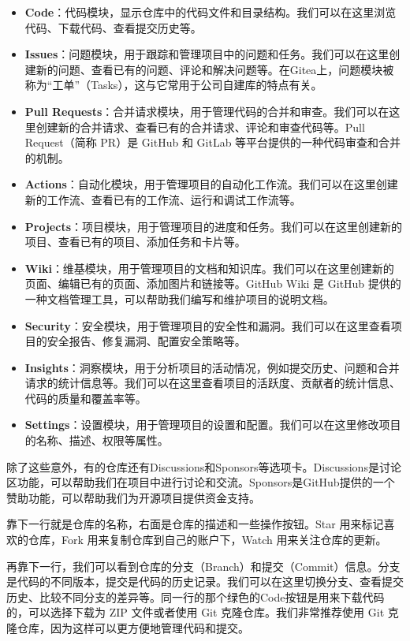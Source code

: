 \documentclass[fontset=none]{ctexart}
\begin{document}
\begin{itemize}
    \item \textbf{Code}：代码模块，显示仓库中的代码文件和目录结构。我们可以在这里浏览代码、下载代码、查看提交历史等。
    \item \textbf{Issues}：问题模块，用于跟踪和管理项目中的问题和任务。我们可以在这里创建新的问题、查看已有的问题、评论和解决问题等。在Gitea上，问题模块被称为“工单”（Tasks），这与它常用于公司自建库的特点有关。
    \item \textbf{Pull Requests}：合并请求模块，用于管理代码的合并和审查。我们可以在这里创建新的合并请求、查看已有的合并请求、评论和审查代码等。Pull Request（简称 PR）是 GitHub 和 GitLab 等平台提供的一种代码审查和合并的机制。
    \item \textbf{Actions}：自动化模块，用于管理项目的自动化工作流。我们可以在这里创建新的工作流、查看已有的工作流、运行和调试工作流等。
    \item \textbf{Projects}：项目模块，用于管理项目的进度和任务。我们可以在这里创建新的项目、查看已有的项目、添加任务和卡片等。
    \item \textbf{Wiki}：维基模块，用于管理项目的文档和知识库。我们可以在这里创建新的页面、编辑已有的页面、添加图片和链接等。GitHub Wiki 是 GitHub 提供的一种文档管理工具，可以帮助我们编写和维护项目的说明文档。
    \item \textbf{Security}：安全模块，用于管理项目的安全性和漏洞。我们可以在这里查看项目的安全报告、修复漏洞、配置安全策略等。
    \item \textbf{Insights}：洞察模块，用于分析项目的活动情况，例如提交历史、问题和合并请求的统计信息等。我们可以在这里查看项目的活跃度、贡献者的统计信息、代码的质量和覆盖率等。
    \item \textbf{Settings}：设置模块，用于管理项目的设置和配置。我们可以在这里修改项目的名称、描述、权限等属性。
\end{itemize}
除了这些意外，有的仓库还有Discussions和Sponsors等选项卡。Discussions是讨论区功能，可以帮助我们在项目中进行讨论和交流。Sponsors是GitHub提供的一个赞助功能，可以帮助我们为开源项目提供资金支持。

靠下一行就是仓库的名称，右面是仓库的描述和一些操作按钮。Star 用来标记喜欢的仓库，Fork 用来复制仓库到自己的账户下，Watch 用来关注仓库的更新。

再靠下一行，我们可以看到仓库的分支（Branch）和提交（Commit）信息。分支是代码的不同版本，提交是代码的历史记录。我们可以在这里切换分支、查看提交历史、比较不同分支的差异等。同一行的那个绿色的Code按钮是用来下载代码的，可以选择下载为 ZIP 文件或者使用 Git 克隆仓库。我们非常推荐使用 Git 克隆仓库，因为这样可以更方便地管理代码和提交。
\end{document}
